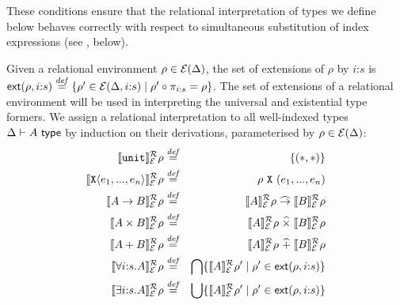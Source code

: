 %
%
\noindent
These conditions ensure that the relational interpretation of types we
define below behaves correctly with respect to simultaneous
substitution of index expressions (see
, below).

%
Given a relational environment $\rho \in \mathcal{E}(\Delta)$, %
the set of extensions %
of $\rho$ by %
$i\mathord:s$ %
is $\mathsf{ext}(\rho,i\mathord:s) \stackrel{\mathit{def}}= \{ \rho' \in
\mathcal{E}(\Delta,i\mathord:s) \mathrel| \rho' \circ \pi_{i\mathord:s} =
\rho \}$. The set of extensions of a relational environment will be
used in interpreting the universal and existential type formers.  We
assign a relational interpretation to all well-indexed types $\Delta
\vdash A \textup{\textsf{ type}}$ by induction on their derivations, parameterised by
$\rho \in \mathcal{E}(\Delta)$:
\begin{eqnarray*}
  \llbracket \texttt{unit} \rrbracket^{\mathcal{R}}_{\mathcal{E}}{\rho} & \stackrel{\mathit{def}}= & \{(*,*)\} \\
  \llbracket \textup{\texttt{X}}\langle e_1,...,e_n \rangle \rrbracket^{\mathcal{R}}_{\mathcal{E}}{\rho} & \stackrel{\mathit{def}}= & \rho\ {\textup{\texttt{X}}}\ (e_1,...,e_n) \\
  \llbracket A \to B \rrbracket^{\mathcal{R}}_{\mathcal{E}}{\rho} & \stackrel{\mathit{def}}= & \llbracket A \rrbracket^{\mathcal{R}}_{\mathcal{E}}{\rho} \mathrel{\widehat\to} \llbracket B \rrbracket^{\mathcal{R}}_{\mathcal{E}}{\rho} \\
  \llbracket A \times B \rrbracket^{\mathcal{R}}_{\mathcal{E}}{\rho} & \stackrel{\mathit{def}}= & \llbracket A \rrbracket^{\mathcal{R}}_{\mathcal{E}}{\rho} \mathrel{\widehat\times} \llbracket B \rrbracket^{\mathcal{R}}_{\mathcal{E}}{\rho} \\
  \llbracket A + B \rrbracket^{\mathcal{R}}_{\mathcal{E}}{\rho} & \stackrel{\mathit{def}}= & \llbracket A \rrbracket^{\mathcal{R}}_{\mathcal{E}}{\rho} \mathrel{\widehat+} \llbracket B \rrbracket^{\mathcal{R}}_{\mathcal{E}}{\rho} \\
  \llbracket \forall i\mathord:s.A \rrbracket^{\mathcal{R}}_{\mathcal{E}}{\rho} & \stackrel{\mathit{def}}= & \bigcap\{ \llbracket A \rrbracket^{\mathcal{R}}_{\mathcal{E}}{\rho'} \mathrel| \rho' \in \mathsf{ext}(\rho,i\mathord:s) \} \\
  \llbracket \exists i\mathord:s.A \rrbracket^{\mathcal{R}}_{\mathcal{E}}{\rho} & \stackrel{\mathit{def}}= & \bigcup\{ \llbracket A \rrbracket^{\mathcal{R}}_{\mathcal{E}}{\rho'} \mathrel| \rho' \in \mathsf{ext}(\rho,i\mathord:s) \}
\end{eqnarray*}
